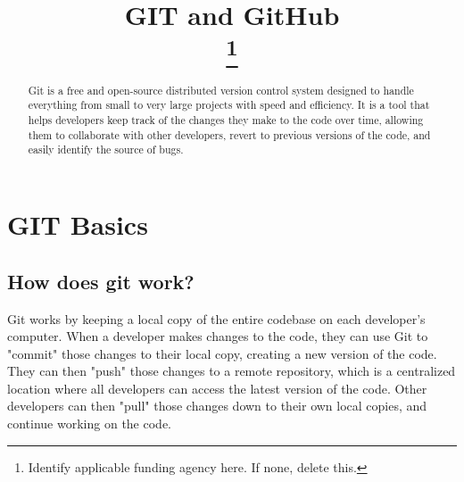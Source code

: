\documentclass[conference]{IEEEtran}
\begin{document}
\title{GIT and GitHub\\
\thanks{Identify applicable funding agency here. If none, delete this.}
}

\author{
\and
{}
\and
{}
}

\maketitle

\begin{abstract}
Git is a free and open-source distributed version control system designed to handle everything from small to very large projects with speed and efficiency. It is a tool that helps developers keep track of the changes they make to the code over time, allowing them to collaborate with other developers, revert to previous versions of the code, and easily identify the source of bugs.
\end{abstract}

\section{GIT Basics}

\subsection{How does git work?}

Git works by keeping a local copy of the entire codebase on each developer's computer. When a developer makes changes to the code, they can use Git to "commit" those changes to their local copy, creating a new version of the code. They can then "push" those changes to a remote repository, which is a centralized location where all developers can access the latest version of the code. Other developers can then "pull" those changes down to their own local copies, and continue working on the code.
\end{document}
